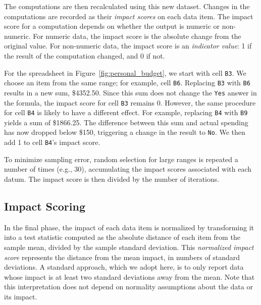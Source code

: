 The computations are then recalculated using this new dataset. Changes
in the computations are recorded as their \emph{impact scores} on each
data item.  The impact score for a computation depends on whether the
output is numeric or non-numeric. For numeric data, the impact score
is the absolute change from the original value.
For non-numeric data, the impact score is an \emph{indicator value}: 1
if the result of the computation changed, and 0 if not.

For the spreadsheet in Figure~\ref{fig:personal_budget}, we %
start with cell \texttt{B3}. We choose an item from the same
range; for example, cell \texttt{B6}. Replacing \texttt{B3}
with \texttt{B6} results in a new sum, \$4352.50. Since this sum does
not change the \texttt{Yes} answer in the formula, the impact score
for cell \texttt{B3} remains 0.
However, the same procedure for cell \texttt{B4} is likely to have a
different effect.  For example, replacing \texttt{B4}
with \texttt{B9} yields a sum of \$1866.25. The difference
between this sum and actual spending has now dropped below \$150,
triggering a change in the result to \texttt{No}. We then
add 1 to cell \texttt{B4}'s impact score.


To minimize sampling error, random
selection for large ranges is repeated a number of times (e.g., 30),
accumulating the impact scores associated with each datum. The impact
score is then divided by the number of
iterations. 

\subsection{Impact Scoring}

In the final phase, the impact of each data item is normalized by transforming
it into a test statistic computed as the absolute distance of each item from
the sample mean, divided by the sample standard deviation. This
\emph{normalized impact score} represents the distance from the mean impact,
in numbers of standard deviations. A standard approach, which we adopt here,
is to only report data whose impact is at least two standard deviations away
from the mean. Note that this interpretation does not depend on normality
assumptions about the data or its impact.

